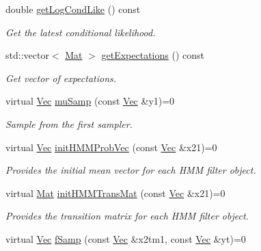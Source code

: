 \begin{DoxyCompactItemize}
double \hyperlink{classHmm__Rbpf__BS_afe3431ed081092533c65ac55ae61c625}{get\+Log\+Cond\+Like} () const 
\begin{DoxyCompactList}\small\item\em Get the latest conditional likelihood. \end{DoxyCompactList}\item 
std\+::vector$<$ \hyperlink{apf__filter_8h_ae601f56a556993079f730483c574356f}{Mat} $>$ \hyperlink{classHmm__Rbpf__BS_a91a69878e000492ce98ba270075ca0e2}{get\+Expectations} () const 
\begin{DoxyCompactList}\small\item\em Get vector of expectations. \end{DoxyCompactList}\item 
virtual \hyperlink{apf__filter_8h_a4c7df05c6f5e8a0d15ae14bcdbc07152}{Vec} \hyperlink{classHmm__Rbpf__BS_ab34e043feed01165f4dbe82ed109c8b2}{mu\+Samp} (const \hyperlink{apf__filter_8h_a4c7df05c6f5e8a0d15ae14bcdbc07152}{Vec} \&y1)=0
\begin{DoxyCompactList}\small\item\em Sample from the first sampler. \end{DoxyCompactList}\item 
virtual \hyperlink{apf__filter_8h_a4c7df05c6f5e8a0d15ae14bcdbc07152}{Vec} \hyperlink{classHmm__Rbpf__BS_a8eb90ceb79d049a20f9d919e54e42581}{init\+H\+M\+M\+Prob\+Vec} (const \hyperlink{apf__filter_8h_a4c7df05c6f5e8a0d15ae14bcdbc07152}{Vec} \&x21)=0
\begin{DoxyCompactList}\small\item\em Provides the initial mean vector for each H\+MM filter object. \end{DoxyCompactList}\item 
virtual \hyperlink{apf__filter_8h_ae601f56a556993079f730483c574356f}{Mat} \hyperlink{classHmm__Rbpf__BS_a18dcd75f96604e26bd9935b3c08f78cd}{init\+H\+M\+M\+Trans\+Mat} (const \hyperlink{apf__filter_8h_a4c7df05c6f5e8a0d15ae14bcdbc07152}{Vec} \&x21)=0
\begin{DoxyCompactList}\small\item\em Provides the transition matrix for each H\+MM filter object. \end{DoxyCompactList}\item 
virtual \hyperlink{apf__filter_8h_a4c7df05c6f5e8a0d15ae14bcdbc07152}{Vec} \hyperlink{classHmm__Rbpf__BS_acc905cb6e7962d958586af494d0e953c}{f\+Samp} (const \hyperlink{apf__filter_8h_a4c7df05c6f5e8a0d15ae14bcdbc07152}{Vec} \&x2tm1, const \hyperlink{apf__filter_8h_a4c7df05c6f5e8a0d15ae14bcdbc07152}{Vec} \&yt)=0

\end{DoxyCompactItemize}
